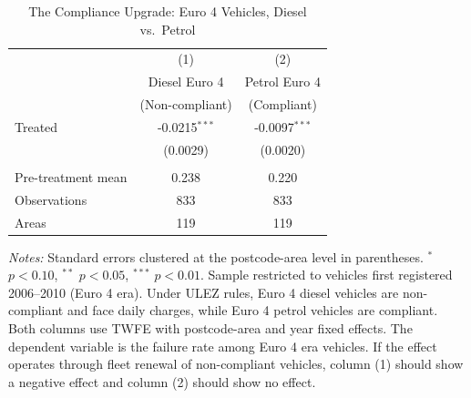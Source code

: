 \begin{table}[H]
\centering
\caption{The Compliance Upgrade: Euro 4 Vehicles, Diesel vs.\ Petrol}
\label{tab:placebo}
\begin{threeparttable}
\begin{tabular}{lcc}
\toprule
 & (1) & (2) \\
 & Diesel Euro 4 & Petrol Euro 4 \\
 & (Non-compliant) & (Compliant) \\
\midrule
Treated & -0.0215$^{***}$ & -0.0097$^{***}$ \\
 & (0.0029) & (0.0020) \\
\\
Pre-treatment mean & 0.238 & 0.220 \\
Observations & 833 & 833 \\
Areas & 119 & 119 \\
\bottomrule
\end{tabular}
\begin{tablenotes}[flushleft]
\small
\item \textit{Notes:} Standard errors clustered at the postcode-area level in parentheses. $^{*}$ $p<0.10$, $^{**}$ $p<0.05$, $^{***}$ $p<0.01$. Sample restricted to vehicles first registered 2006--2010 (Euro 4 era). Under ULEZ rules, Euro 4 diesel vehicles are non-compliant and face daily charges, while Euro 4 petrol vehicles are compliant. Both columns use TWFE with postcode-area and year fixed effects. The dependent variable is the failure rate among Euro 4 era vehicles. If the effect operates through fleet renewal of non-compliant vehicles, column (1) should show a negative effect and column (2) should show no effect.
\end{tablenotes}
\end{threeparttable}
\end{table}
